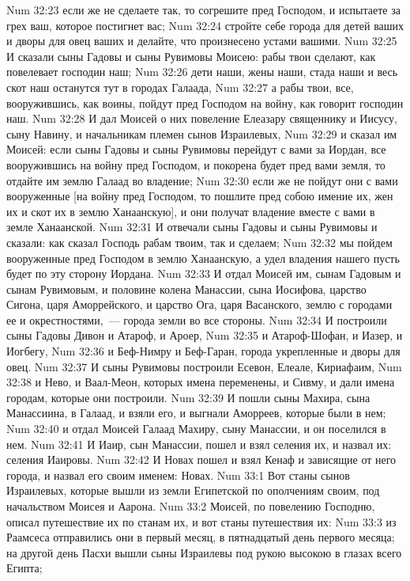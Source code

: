 \vs Num 32:23 если же не сделаете так, то согрешите пред Господом, и испытаете  за грех ваш, которое постигнет вас;
\vs Num 32:24 стройте себе города для детей ваших и дворы для овец ваших и делайте, что произнесено устами вашими.
\vs Num 32:25 И сказали сыны Гадовы и сыны Рувимовы Моисею: рабы твои сделают, как повелевает господин наш;
\vs Num 32:26 дети наши, жены наши, стада наши и весь скот наш останутся тут в городах Галаада,
\vs Num 32:27 а рабы твои, все, вооружившись, как воины, пойдут пред Господом на войну, как говорит господин наш.
\vs Num 32:28 И дал Моисей о них повеление Елеазару священнику и Иисусу, сыну Навину, и начальникам племен сынов Израилевых,
\vs Num 32:29 и сказал им Моисей: если сыны Гадовы и сыны Рувимовы перейдут с вами за Иордан, все вооружившись на войну пред Господом, и покорена будет пред вами земля, то отдайте им землю Галаад во владение;
\vs Num 32:30 если же не пойдут они с вами вооруженные [на войну пред Господом, то пошлите пред собою имение их, жен их и скот их в землю Ханаанскую], и они получат владение вместе с вами в земле Ханаанской.
\vs Num 32:31 И отвечали сыны Гадовы и сыны Рувимовы и сказали: как сказал Господь рабам твоим, так и сделаем;
\vs Num 32:32 мы пойдем вооруженные пред Господом в землю Ханаанскую, а удел владения нашего пусть будет по эту сторону Иордана.
\vs Num 32:33 И отдал Моисей им, сынам Гадовым и сынам Рувимовым, и половине колена Манассии, сына Иосифова, царство Сигона, царя Аморрейского, и царство Ога, царя Васанского, землю с городами ее и окрестностями,~--- города земли во все стороны.
\vs Num 32:34 И построили сыны Гадовы Дивон и Атароф, и Ароер,
\vs Num 32:35 и Атароф-Шофан, и Иазер, и Иогбегу,
\vs Num 32:36 и Беф-Нимру и Беф-Гаран, города укрепленные и дворы для овец.
\vs Num 32:37 И сыны Рувимовы построили Есевон, Елеале, Кириафаим,
\vs Num 32:38 и Нево, и Ваал-Меон, которых имена переменены, и Сивму, и дали имена городам, которые они построили.
\vs Num 32:39 И пошли сыны Махира, сына Манассиина, в Галаад, и взяли его, и выгнали Аморреев, которые были в нем;
\vs Num 32:40 и отдал Моисей Галаад Махиру, сыну Манассии, и он поселился в нем.
\vs Num 32:41 И Иаир, сын Манассии, пошел и взял селения их, и назвал их: селения Иаировы.
\vs Num 32:42 И Новах пошел и взял Кенаф и зависящие от него города, и назвал его своим именем: Новах.
\vs Num 33:1 Вот станы сынов Израилевых, которые вышли из земли Египетской по ополчениям своим, под начальством Моисея и Аарона.
\vs Num 33:2 Моисей, по повелению Господню, описал путешествие их по станам их, и вот станы путешествия их:
\vs Num 33:3 из Раамсеса отправились они в первый месяц, в пятнадцатый день первого месяца; на другой день Пасхи вышли сыны Израилевы под рукою высокою в глазах всего Египта;
